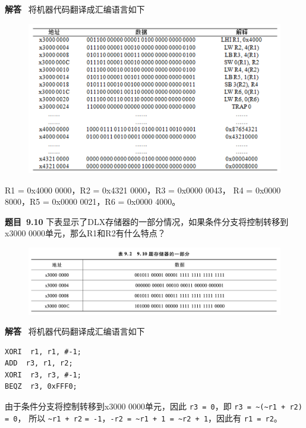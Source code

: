 \documentclass[10pt,a4paper,UTF8]{ctexart}
\newcommand{\problemname}{待定义}
\newenvironment{problem}{\begin{shaded}\par\noindent\textbf{题目\  \problemname}}{\end{shaded}\par}
\newenvironment{solution}{\par\noindent\textbf{解答}\ }{\par}
\begin{document}
\begin{solution}
	将机器代码翻译成汇编语言如下
	\begin{figure}[H]
		\centering
		\includegraphics[scale=0.5]{img/9.9a}
	\end{figure}

	R1 = 0x4000 0000，R2 = 0x4321 0000，R3 = 0x0000 0043，
	R4 = 0x0000 8000，R5 = 0x0000 0021，R6 = 0x0000 4000。
\end{solution}


\renewcommand{\problemname}{9.10}
\begin{problem}
	下表显示了DLX存储器的一部分情况，如果条件分支将控制转移到 
	x3000 0000单元，那么R1和R2有什么特点？
\end{problem}

\begin{figure}[H]
	\centering
	\includegraphics[scale=0.5]{img/9.10}
\end{figure}

\begin{solution}
	将机器代码翻译成汇编语言如下
	\begin{lstlisting}
XORI  r1, r1, #-1;   
ADD  r3, r1, r2;   
XORI  r3, r3, #-1; 
BEQZ  r3, 0xFFF0;
	\end{lstlisting}
	由于条件分支将控制转移到x3000 0000单元，因此 \verb|r3 = 0|，即 \verb|r3 = ~(~r1 + r2) = 0|，
	所以 \verb|~r1 + r2| \verb|= -1|，\verb|-r2 = ~r1 + 1 = ~r2 + 1|，因此有 \verb|r1 = r2|。
\end{solution}
\end{document}
